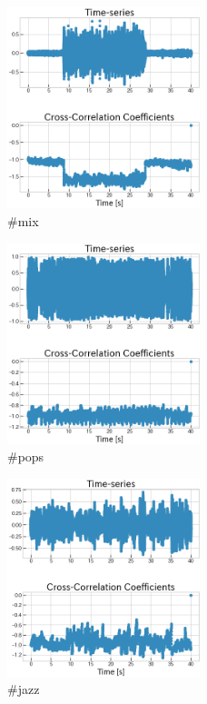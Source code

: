 \documentclass[technicalreport]{ieicej}
\begin{document}
\begin{figure}
	\centering
	\includegraphics[width=0.5\textwidth]{fig/mix.png}
	\caption{\#mix}
	\label{fig:result_mix}
\end{figure}
\begin{figure}
	\centering
	\includegraphics[width=0.5\textwidth]{fig/pops.png}
	\caption{\#pops}
	\label{fig:result_pops}
\end{figure}
\begin{figure}
	\centering
	\includegraphics[width=0.5\textwidth]{fig/jazz.png}
	\caption{\#jazz}
	\label{fig:result_jazz}
\end{figure}
\end{document}
